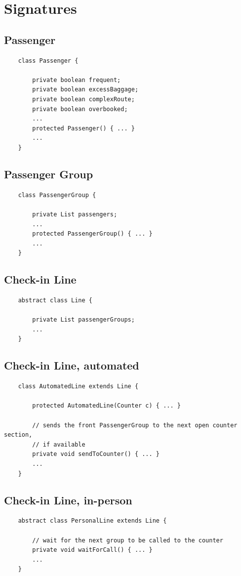 \documentclass{article}
\begin{document}
\section{Signatures}

\pagebreak

\subsection{Passenger}
\begin{verbatim}
    class Passenger {
        
        private boolean frequent;
        private boolean excessBaggage;
        private boolean complexRoute;
        private boolean overbooked;
        ...
        protected Passenger() { ... }
        ...
    }
\end{verbatim}

\subsection{Passenger Group}
\begin{verbatim}
    class PassengerGroup {
        
        private List passengers;
        ...
        protected PassengerGroup() { ... }
        ...
    }
\end{verbatim}

\subsection{Check-in Line}
\begin{verbatim}
    abstract class Line {
        
        private List passengerGroups;
        ...
    }
\end{verbatim}

\subsection{Check-in Line, automated}
\begin{verbatim}
    class AutomatedLine extends Line {
        
        protected AutomatedLine(Counter c) { ... }

        // sends the front PassengerGroup to the next open counter section,
        // if available
        private void sendToCounter() { ... }
        ...
    }
\end{verbatim}

\subsection{Check-in Line, in-person}
\begin{verbatim}
    abstract class PersonalLine extends Line {
        
        // wait for the next group to be called to the counter
        private void waitForCall() { ... }
        ...
    }
\end{verbatim}
\end{document}
